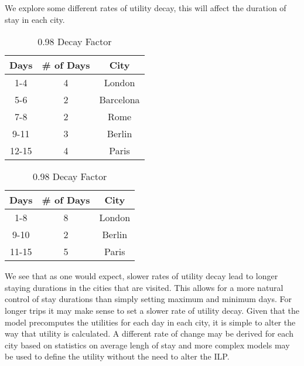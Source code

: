 \documentclass[12pt]{article}
\begin{document}
We explore some different rates of utility decay, this will affect the duration of stay in each city.

\begin{table}[h!]
	\begin{minipage}[b]{0.45\linewidth}
		\centering
		\vspace{1mm}
		\begin{tabular}{c|c|c}
			\hline
			\rule{0pt}{2ex} \textbf{Days} & \textbf{\# of Days} & \textbf{City} \\
			\hline
			1-4 & 4 & London \\
			5-6 & 2 & Barcelona \\
			7-8 & 2 & Rome \\
			9-11 & 3 & Berlin \\
			12-15 & 4 & Paris \\
			\hline
		\end{tabular}
		\caption{0.95 Decay Factor}
	\end{minipage}
	\hspace{0.5cm}
	\begin{minipage}[b]{0.45\linewidth}
		\centering
		\vspace{1mm}
		\begin{tabular}{c|c|c}
			\hline
			\rule{0pt}{2ex} \textbf{Days} & \textbf{\# of Days} & \textbf{City} \\
			\hline
			1-8 & 8 & London \\
			9-10 & 2 & Berlin \\
			11-15 & 5 & Paris \\
			\hline
		\end{tabular}
		\caption{0.98 Decay Factor}
	\end{minipage}
\end{table}

We see that as one would expect, slower rates of utility decay lead to longer staying durations in the cities that are visited. This allows for a more natural control of stay durations than simply setting maximum and minimum days. For longer trips it may make sense to set a slower rate of utility decay. Given that the model precomputes the utilities for each day in each city, it is simple to alter the way that utility is calculated. A different rate of change may be derived for each city based on statistics on average lengh of stay and more complex models may be used to define the utility without the need to alter the ILP.
\end{document}
